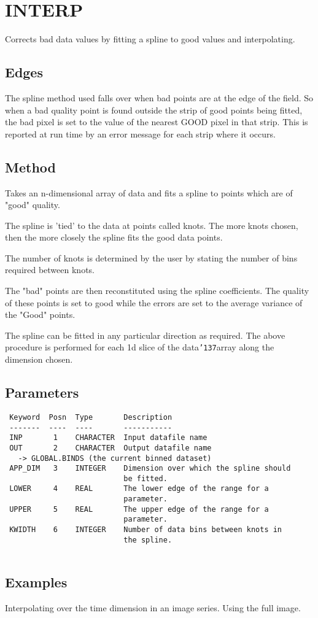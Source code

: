 \documentclass{book}
\renewcommand{\_}{{\tt\char'137}}     %
\begin{document}
\section{INTERP}
Corrects bad data values by fitting a spline to good values and
interpolating.
 
\subsection{Edges}
The spline method used falls over when bad points are at the edge
of the field. So when a bad quality point is found outside the
strip of good points being fitted, the bad pixel is set to the
value of the nearest GOOD pixel in that strip. This is reported
at run time by an error message for each strip where it occurs.
 
\subsection{Method}
Takes an n-dimensional array of data and fits a spline to points
which are of "good" quality.
 
The spline is 'tied' to the data at points called knots. The more
knots chosen, then the more closely the spline fits the good data
points.
 
The number of knots is determined by the user by stating the
number of bins required between knots.
 
The "bad" points are then reconstituted using the spline
coefficients. The quality of these points is set to good while
the errors are set to the average variance of the "Good" points.
 
The spline can be fitted in any particular direction as required.
The above procedure is performed for each 1d slice of the
data\_array along the dimension chosen.
 
\subsection{Parameters}
\begin{verbatim}
 Keyword  Posn  Type       Description
 -------  ----  ----       -----------
 INP       1    CHARACTER  Input datafile name
 OUT       2    CHARACTER  Output datafile name
   -> GLOBAL.BINDS (the current binned dataset)
 APP_DIM   3    INTEGER    Dimension over which the spline should
                           be fitted.
 LOWER     4    REAL       The lower edge of the range for a
                           parameter.
 UPPER     5    REAL       The upper edge of the range for a
                           parameter.
 KWIDTH    6    INTEGER    Number of data bins between knots in
                           the spline.
 
\end{verbatim}\subsection{Examples}
Interpolating over the time dimension in an image series. Using
the full image.
 
\end{document}
